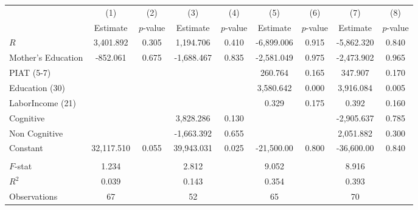 \begin{tabular}{lcccccccc} \toprule
 & (1) & (2) & (3) & (4) & (5) & (6) & (7) & (8) \\ 
 & Estimate  & $p$-value  & Estimate  & $p$-value  & Estimate  & $p$-value  & Estimate  & $p$-value  \\  \midrule
$R$ &  3,401.892 &     0.305 &  1,194.706 &     0.410 & -6,899.006 &     0.915 & -5,862.320 &     0.840 \\  
Mother's Education &  -852.061 &     0.675 & -1,688.467 &     0.835 & -2,581.049 &     0.975 & -2,473.902 &     0.965 \\  
PIAT (5-7) &         &         &         &         &   260.764 &     0.165 &   347.907 &     0.170 \\  
Education (30) &         &         &         &         &  3,580.642 &     0.000 &  3,916.084 &     0.005 \\  
LaborIncome (21) &         &         &         &         &     0.329 &     0.175 &     0.392 &     0.160 \\  
Cognitive &         &         &  3,828.286 &     0.130 &         &         & -2,905.637 &     0.785 \\  
Non Cognitive &         &         & -1,663.392 &     0.655 &         &         &  2,051.882 &     0.300 \\  
Constant & 32,117.510 &     0.055 & 39,943.031 &     0.025 & -21,500.00 &     0.800 & -36,600.00 &     0.840 \\  \\ \midrule
$F$-stat &     1.234 &         &     2.812 &         &     9.052 &         &     8.916 &         \\  
$R^2$ &     0.039 &         &     0.143 &         &     0.354 &         &     0.393 &         \\  
Observations &    67 &         &    52 &         &    65 &         &    70 &         \\  
\bottomrule \end{tabular}
